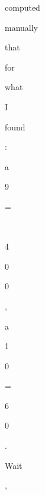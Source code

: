 \begin{figure}[p]
\begin{tcolorbox}
\colorbox{red!97}{\strut\scriptsize  computed}\allowbreak\hspace{0pt}%
\colorbox{red!100}{\strut\scriptsize  manually}\allowbreak\hspace{0pt}%
\colorbox{red!100}{\strut\scriptsize  that}\allowbreak\hspace{0pt}%
\colorbox{red!96}{\strut\scriptsize  for}\allowbreak\hspace{0pt}%
\colorbox{red!86}{\strut\scriptsize  what}\allowbreak\hspace{0pt}%
\colorbox{red!100}{\strut\scriptsize  I}\allowbreak\hspace{0pt}%
\colorbox{red!95}{\strut\scriptsize  found}\allowbreak\hspace{0pt}%
\colorbox{red!99}{\strut\scriptsize :  }\allowbreak\hspace{0pt}%
\colorbox{red!100}{\strut\scriptsize a}\allowbreak\hspace{0pt}%
\colorbox{red!84}{\strut\scriptsize 9}\allowbreak\hspace{0pt}%
\colorbox{orange!40}{\strut\scriptsize  =}\allowbreak\hspace{0pt}%
\colorbox{green!11}{\strut\scriptsize \,}\allowbreak\hspace{0pt}%
\colorbox{green!71}{\strut\scriptsize 4}\allowbreak\hspace{0pt}%
\colorbox{red!89}{\strut\scriptsize 0}\allowbreak\hspace{0pt}%
\colorbox{green!13}{\strut\scriptsize 0}\allowbreak\hspace{0pt}%
\colorbox{green!11}{\strut\scriptsize ,}\allowbreak\hspace{0pt}%
\colorbox{red!87}{\strut\scriptsize  a}\allowbreak\hspace{0pt}%
\colorbox{red!52}{\strut\scriptsize 1}\allowbreak\hspace{0pt}%
\colorbox{yellow!30}{\strut\scriptsize 0}\allowbreak\hspace{0pt}%
\colorbox{orange!61}{\strut\scriptsize =}\allowbreak\hspace{0pt}%
\colorbox{red!72}{\strut\scriptsize 6}\allowbreak\hspace{0pt}%
\colorbox{red!46}{\strut\scriptsize 0}\allowbreak\hspace{0pt}%
\colorbox{red!74}{\strut\scriptsize .   }\allowbreak\hspace{0pt}%
\colorbox{red!99}{\strut\scriptsize Wait}\allowbreak\hspace{0pt}%
\colorbox{red!58}{\strut\scriptsize ,}\allowbreak\hspace{0pt}%

\end{tcolorbox}
\end{figure}
